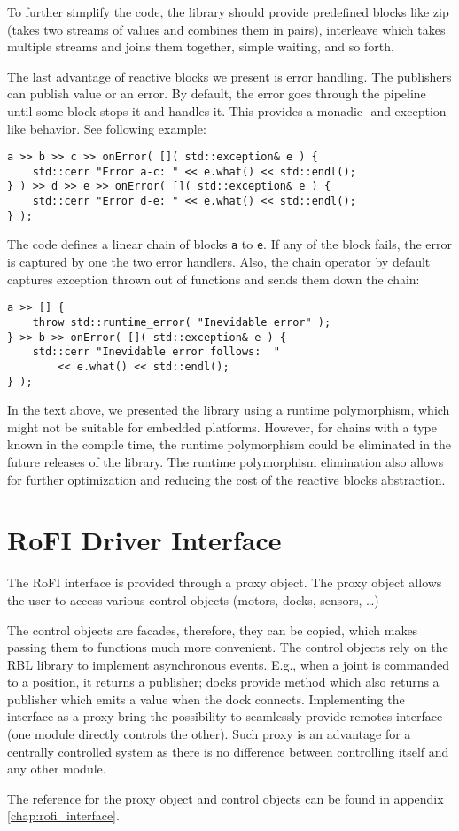 To further simplify the code, the library should provide predefined blocks like
zip (takes two streams of values and combines them in pairs), interleave which
takes multiple streams and joins them together, simple waiting, and so forth.

The last advantage of reactive blocks we present is error handling. The
publishers can publish value or an error. By default, the error goes through the
pipeline until some block stops it and handles it. This provides a monadic- and
exception-like behavior. See following example:
\begin{verbatim}
a >> b >> c >> onError( []( std::exception& e ) {
    std::cerr "Error a-c: " << e.what() << std::endl();
} ) >> d >> e >> onError( []( std::exception& e ) {
    std::cerr "Error d-e: " << e.what() << std::endl();
} );
\end{verbatim}
The code defines a linear chain of blocks \texttt{a} to \texttt{e}. If any of
the block fails, the error is captured by one the two error handlers. Also, the
chain operator by default captures exception thrown out of functions and sends
them down the chain:
\begin{verbatim}
a >> [] {
    throw std::runtime_error( "Inevidable error" );
} >> b >> onError( []( std::exception& e ) {
    std::cerr "Inevidable error follows:  "
        << e.what() << std::endl();
} );
\end{verbatim}

In the text above, we presented the library using a runtime polymorphism, which
might not be suitable for embedded platforms. However, for chains with a type
known in the compile time, the runtime polymorphism could be eliminated in the
future releases of the library. The runtime polymorphism elimination also allows
for further optimization and reducing the cost of the reactive blocks
abstraction.

\section{RoFI Driver Interface}

The RoFI interface is provided through a proxy object. The proxy object allows
the user to access various control objects (motors, docks, sensors, \ldots)

The control objects are facades, therefore, they can be copied, which makes
passing them to functions much more convenient. The control objects rely on the
RBL library to implement asynchronous events. E.g., when a joint is commanded to
a position, it returns a publisher; docks provide method  which
also returns a publisher which emits a value when the dock connects.
Implementing the interface as a proxy bring the possibility to seamlessly
provide remotes interface (one module directly controls the other). Such proxy
is an advantage for a centrally controlled system as there is no difference
between controlling itself and any other module.

The reference for the proxy object and control objects can be found in appendix
\ref{chap:rofi_interface}.